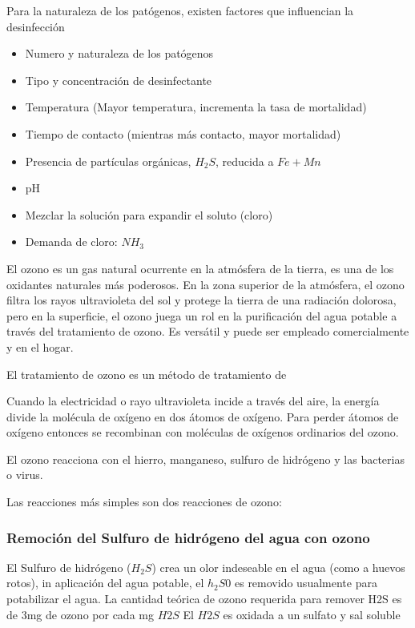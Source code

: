 Para la naturaleza de los patógenos, existen factores que influencian la desinfección
\begin{itemize}
    \item Numero y naturaleza de los patógenos
    \item Tipo y concentración de desinfectante
    \item Temperatura (Mayor temperatura, incrementa la tasa de mortalidad)
    \item Tiempo de contacto (mientras más contacto, mayor mortalidad)
    \item Presencia de partículas orgánicas, $H_2S$, reducida a $Fe+Mn$ 
    \item pH
    \item Mezclar la solución para expandir el soluto (cloro)
    \item Demanda de cloro: $NH_3$
\end{itemize}

El ozono es un gas natural ocurrente en la atmósfera de la tierra, es una de los oxidantes naturales más poderosos. En la zona superior de la atmósfera, el ozono filtra los rayos ultravioleta del sol y protege la tierra de una radiación dolorosa, pero en la superficie, el ozono juega un rol en la purificación del agua potable a través del tratamiento de ozono. Es versátil y puede ser empleado comercialmente y en el hogar.

El tratamiento de ozono es un método de tratamiento de 

Cuando la electricidad o rayo ultravioleta incide a través del aire, la energía divide la molécula de oxígeno en dos átomos de oxígeno.
Para perder átomos de oxígeno entonces se recombinan con moléculas de oxígenos ordinarios del ozono.

El ozono reacciona con el hierro, manganeso, sulfuro de hidrógeno y las bacterias o virus.

Las reacciones más simples son dos reacciones de ozono: 

\subsubsection{Remoción del Sulfuro de hidrógeno del agua con ozono}
El Sulfuro de hidrógeno ($H_2S$) crea un olor indeseable en el agua (como a huevos rotos), in aplicación del agua potable, el $h_2S0$ es removido usualmente para potabilizar el agua. La cantidad teórica de ozono requerida para remover H2S es de 3mg de ozono por cada mg $H2S$ El $H2S$ es oxidada a un sulfato y sal soluble

